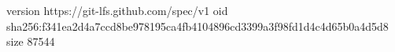 version https://git-lfs.github.com/spec/v1
oid sha256:f341ea2d4a7ccd8be978195ca4fb4104896cd3399a3f98fd1d4c4d65b0a4d5d8
size 87544

